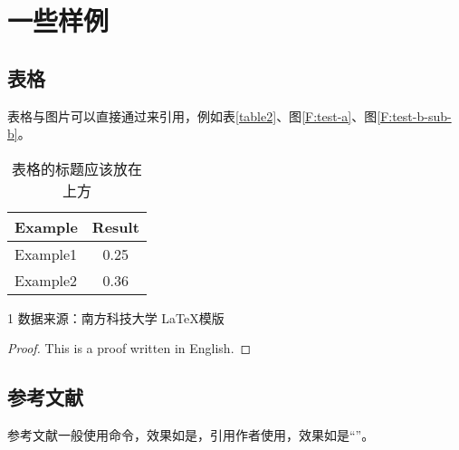 
\section{一些样例}

\subsection{表格}

表格与图片可以直接通过\verbbox{\ref{<key>}}来引用，例如表\ref{table2}、图\ref{F:test-a}、图\ref{F:test-b-sub-b}。

\begin{table}[htb]
    \centering
    \caption{表格的标题应该放在上方}
    \label{table}
    \begin{tabular}{lc} %
        \toprule
        Example & Result \\
        \midrule
        Example1          & 0.25 \\
        Example2          & 0.36 \\
        \bottomrule
    \end{tabular}
\end{table}

\begin{table}[htb]
    \centering
    \caption{带表注的表格的标题}
    \label{table2}
    \begin{threeparttable}
        \begin{tablenotes}
            \item[1] 数据来源：南方科技大学 \LaTeX 模版 %
        \end{tablenotes}
    \end{threeparttable}
\end{table}

\begin{proof}
    This is a proof written in English.
\end{proof}

\subsection{参考文献}

参考文献一般使用命令，效果如是\cite{Nicholas1998Handbook}，引用作者使用，效果如是“\citeauthor{goossens1994latex}”。
